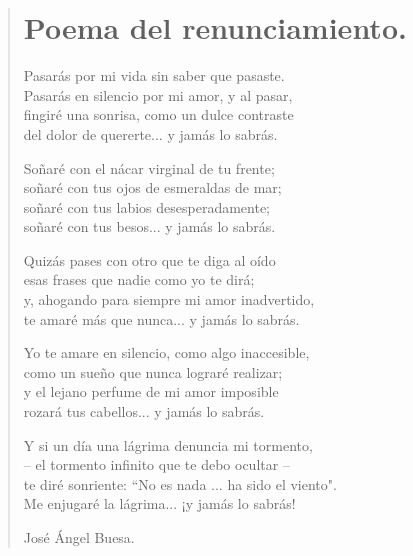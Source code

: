 \documentclass[11pt, portrait, twoside, notitlepage, openright]{book}
\begin{document}
\newpage
\begin{verse}
\begin{center}
\section{Poema del renunciamiento.}
\end{center}
Pasarás por mi vida sin saber que pasaste.\\
Pasarás en silencio por mi amor, y al pasar,\\
fingiré una sonrisa, como un dulce contraste\\
del dolor de quererte... y jamás lo sabrás.
\newline

Soñaré con el nácar virginal de tu frente;\\
soñaré con tus ojos de esmeraldas de mar;\\
soñaré con tus labios desesperadamente;\\
soñaré con tus besos... y jamás lo sabrás.
\newline

Quizás pases con otro que te diga al oído\\
esas frases que nadie como yo te dirá;\\
y, ahogando para siempre mi amor inadvertido,\\
te amaré más que nunca... y jamás lo sabrás.
\newline

Yo te amare en silencio, como algo inaccesible,\\
como un sueño que nunca lograré realizar;\\
y el lejano perfume de mi amor imposible\\
rozará tus cabellos... y jamás lo sabrás.
\newpage

Y si un día una lágrima denuncia mi tormento,\\
-- el tormento infinito que te debo ocultar --\\
te diré sonriente: ``No es nada ... ha sido el viento".\\
Me enjugaré la lágrima... ¡y jamás lo sabrás!
\newline

José Ángel Buesa.
\end{verse}
\end{document}
